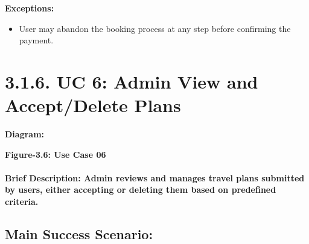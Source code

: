 \documentclass{scrreprt}
\begin{document}
\textbf{Exceptions:}
\begin{itemize}
    \item User may abandon the booking process at any step before confirming the payment.
\end{itemize}


\section*{\textbf{3.1.6. UC 6: Admin View and Accept/Delete Plans}}
\textbf{Diagram:}
\newline
\newline

\begin{center}
    \parbox{0.8\textwidth}{ 
        \centering
       
    }
\end{center}
\begin{center}
    \parbox{0.8\textwidth}{ 
        \centering
        \textbf{Figure-3.6: Use Case 06}
    }
\end{center}

\paragraph {\textnormal{Brief Description: 
Admin reviews and manages travel plans submitted by users, either accepting or deleting them based on predefined criteria.}}


\subsection*{\textbf{Main Success Scenario:}}
\end{document}

